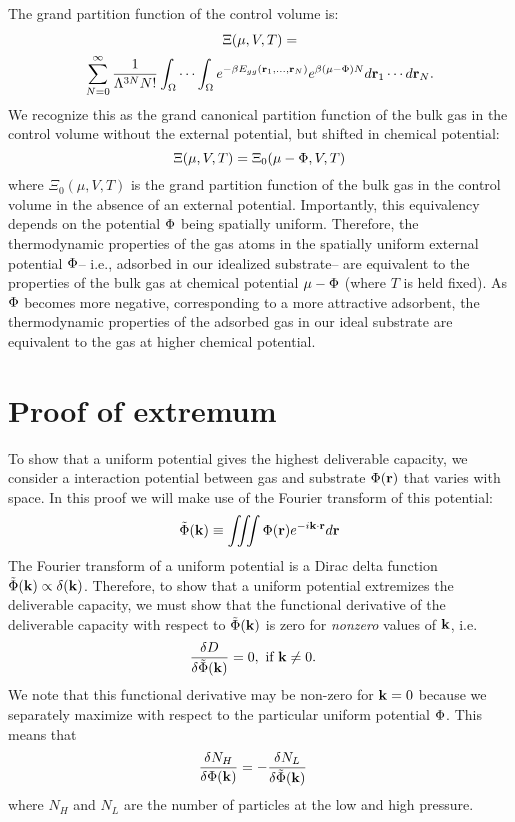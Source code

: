 The grand partition function of the control volume is:
\begin{multline}
    \Xi(\mu, V, T)= \\ \displaystyle \sum_{N=0}^\infty \frac{1}{\Lambda^{3N}N!} \int_{\Omega} \cdots \int_{\Omega} e^{-\beta E_{gg}(\mathbf{r}_1, ..., \mathbf{r}_N)} e^{\beta (\mu - \Phi) N} d\mathbf{r}_1 \cdots d\mathbf{r}_N.
    \label{eq:gcpf}
\end{multline}
We recognize this as the grand canonical partition function of the bulk gas in
the control volume without the external potential, but shifted in chemical
potential:
\begin{equation}
    \Xi(\mu, V, T)=\Xi_0(\mu - \Phi, V, T)
    \label{eq:xi_vs_xi0}
\end{equation}
where $\Xi_0(\mu, V, T)$ is the grand partition function of the bulk
gas in the control volume in the absence of an external potential. Importantly,
this equivalency depends on the potential $\Phi$ being spatially uniform.
Therefore, the thermodynamic properties of the gas atoms in the spatially
uniform external potential $\Phi$-- i.e., adsorbed in our idealized substrate--
are equivalent to the properties of the bulk gas at chemical potential $\mu-\Phi$
(where $T$ is held fixed). As $\Phi$ becomes more negative, corresponding to a
more attractive adsorbent, the thermodynamic properties of the adsorbed gas in
our ideal substrate are equivalent to the gas at higher chemical potential.

\section{Proof of extremum}\label{sec:proof-extremum}
To show that a uniform potential gives the highest deliverable capacity, we
consider a interaction potential between gas and substrate $\Phi(\mathbf{r})$ that
varies with space.  In this proof we will make use of the Fourier transform of
this potential:
\begin{align}
    \tilde\Phi(\mathbf{k}) \equiv \iiint \Phi(\mathbf{r}) e^{-i\mathbf{k}\cdot \mathbf{r}} d\mathbf{r}
\end{align}
The Fourier transform of a uniform potential is a Dirac delta function $\tilde{\Phi}(\mathbf{k})\propto\delta(\mathbf{k})$. Therefore, to show that a uniform potential
extremizes the deliverable capacity, we must show that the functional
derivative of the deliverable capacity with respect to $\tilde\Phi(\mathbf{k})$ is zero for
\emph{nonzero} values of $\mathbf{k}$, i.e.
\begin{align}
    \frac{\delta D}{\delta \tilde\Phi(\mathbf{k})} &= 0, \text{ if } \mathbf{k}\ne 0.
\end{align}
We note that this functional derivative may be non-zero for $\mathbf{k}=0$ because
we separately maximize with respect to the particular uniform potential $\Phi$.
This means that
\begin{align}
    \frac{\delta N_H}{\delta \Phi(\mathbf{k})} &= -\frac{\delta N_L}{\delta \tilde\Phi(\mathbf{k})}
\end{align}
where $N_H$ and $N_L$ are the number of particles at the low and high pressure.

